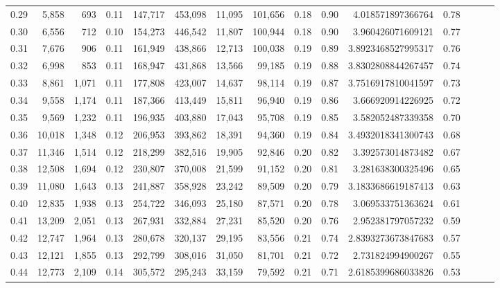 \begin{tabular}{rrrrrrrrrrrrrrr}
0.29 &   5,858 &    693 &  0.11 &  147,717 &  453,098 &   11,095 &  101,656 &  0.18 &  0.90 &       4.018571897366764 &      0.78 \\
0.30 &   6,556 &    712 &  0.10 &  154,273 &  446,542 &   11,807 &  100,944 &  0.18 &  0.90 &       3.960426071609121 &      0.77 \\
0.31 &   7,676 &    906 &  0.11 &  161,949 &  438,866 &   12,713 &  100,038 &  0.19 &  0.89 &      3.8923468527995317 &      0.76 \\
0.32 &   6,998 &    853 &  0.11 &  168,947 &  431,868 &   13,566 &   99,185 &  0.19 &  0.88 &      3.8302808844267457 &      0.74 \\
0.33 &   8,861 &  1,071 &  0.11 &  177,808 &  423,007 &   14,637 &   98,114 &  0.19 &  0.87 &      3.7516917810041597 &      0.73 \\
0.34 &   9,558 &  1,174 &  0.11 &  187,366 &  413,449 &   15,811 &   96,940 &  0.19 &  0.86 &       3.666920914226925 &      0.72 \\
0.35 &   9,569 &  1,232 &  0.11 &  196,935 &  403,880 &   17,043 &   95,708 &  0.19 &  0.85 &       3.582052487339358 &      0.70 \\
0.36 &  10,018 &  1,348 &  0.12 &  206,953 &  393,862 &   18,391 &   94,360 &  0.19 &  0.84 &      3.4932018341300743 &      0.68 \\
0.37 &  11,346 &  1,514 &  0.12 &  218,299 &  382,516 &   19,905 &   92,846 &  0.20 &  0.82 &       3.392573014873482 &      0.67 \\
0.38 &  12,508 &  1,694 &  0.12 &  230,807 &  370,008 &   21,599 &   91,152 &  0.20 &  0.81 &       3.281638300325496 &      0.65 \\
0.39 &  11,080 &  1,643 &  0.13 &  241,887 &  358,928 &   23,242 &   89,509 &  0.20 &  0.79 &      3.1833686619187413 &      0.63 \\
0.40 &  12,835 &  1,938 &  0.13 &  254,722 &  346,093 &   25,180 &   87,571 &  0.20 &  0.78 &       3.069533751363624 &      0.61 \\
0.41 &  13,209 &  2,051 &  0.13 &  267,931 &  332,884 &   27,231 &   85,520 &  0.20 &  0.76 &       2.952381797057232 &      0.59 \\
0.42 &  12,747 &  1,964 &  0.13 &  280,678 &  320,137 &   29,195 &   83,556 &  0.21 &  0.74 &      2.8393273673847683 &      0.57 \\
0.43 &  12,121 &  1,855 &  0.13 &  292,799 &  308,016 &   31,050 &   81,701 &  0.21 &  0.72 &       2.731824994900267 &      0.55 \\
0.44 &  12,773 &  2,109 &  0.14 &  305,572 &  295,243 &   33,159 &   79,592 &  0.21 &  0.71 &      2.6185399686033826 &      0.53 \\

\end{tabular}

